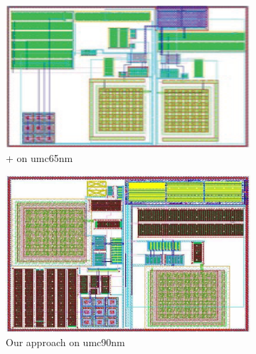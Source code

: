 \begin{figure}[ht]
\begin{subfigure}[t]{0.4\textwidth}
      \end{subfigure}
      \begin{subfigure}[t]{0.4\textwidth}
      \includegraphics[width=\textwidth,angle=90]{Fig/LDO_umc65_PlFuRtCDT_1.eps}
      \caption{\cite{msc-bhattacharya-tcad06}+\cite{Chin_DMR_ICCAD2013} on umc65nm }\label{subfig:LDO_umc65_PlFuRtCDT}
      \end{subfigure}
      \begin{subfigure}[t]{0.4\textwidth}
      \includegraphics[width=\textwidth]{Fig/LDO_umc90_PlFxRtCDT.eps}
      \caption{Our approach on umc90nm }\label{subfig:LDO_umc90_PlFxRtCDT}
      \end{subfigure}
      \begin{subfigure}[t]{0.4\textwidth}

\end{subfigure}
\end{figure}
